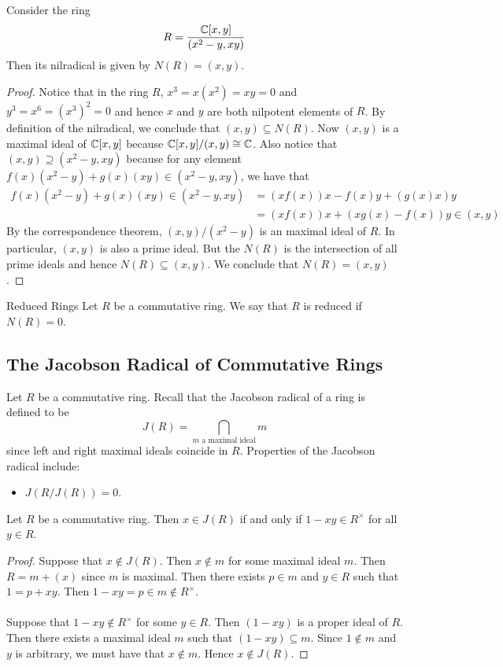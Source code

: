 \documentclass[a4paper]{article}
\begin{document}
\begin{eg}{}{} Consider the ring $$R=\frac{\mathbb{C}[x,y]}{(x^2-y,xy)}$$ Then its nilradical is given by $N(R)=(x,y)$. \tcbline
\begin{proof}
Notice that in the ring $R$, $x^3=x(x^2)=xy=0$ and $y^3=x^6=(x^3)^2=0$ and hence $x$ and $y$ are both nilpotent elements of $R$. By definition of the nilradical, we conclude that $(x,y)\subseteq N(R)$. Now $(x,y)$ is a maximal ideal of $\mathbb{C}[x,y]$ because $\mathbb{C}[x,y]/(x,y)\cong\mathbb{C}$. Also notice that $(x,y)\supseteq(x^2-y,xy)$ because for any element $f(x)(x^2-y)+g(x)(xy)\in(x^2-y,xy)$, we have that 
\begin{align*}
f(x)(x^2-y)+g(x)(xy)\in(x^2-y,xy)&=(xf(x))x-f(x)y+(g(x)x)y\\
&=(xf(x))x+(xg(x)-f(x))y\in (x,y)
\end{align*}
By the correspondence theorem, $(x,y)/(x^2-y)$ is an maximal ideal of $R$. In particular, $(x,y)$ is also a prime ideal. But the $N(R)$ is the intersection of all prime ideals and hence $N(R)\subseteq(x,y)$. We conclude that $N(R)=(x,y)$. 
\end{proof}
\end{eg}

\begin{defn}{Reduced Rings}{} Let $R$ be a commutative ring. We say that $R$ is reduced if $N(R)=0$. 
\end{defn}

\subsection{The Jacobson Radical of Commutative Rings}
Let $R$ be a commutative ring. Recall that the Jacobson radical of a ring is defined to be $$J(R)=\bigcap_{m\text{ a maximal ideal}}m$$ since left and right maximal ideals coincide in $R$. Properties of the Jacobson radical include: 
\begin{itemize}
\item $J(R/J(R))=0$. 
\end{itemize}

\begin{lmm}{}{} Let $R$ be a commutative ring. Then $x\in J(R)$ if and only if $1-xy\in R^\times$ for all $y\in R$. \tcbline
\begin{proof}
Suppose that $x\notin J(R)$. Then $x\notin m$ for some maximal ideal $m$. Then $R=m+(x)$ since $m$ is maximal. Then there exists $p\in m$ and $y\in R$ such that $1=p+xy$. Then $1-xy=p\in m\notin R^\times$. \\~\\

Suppose that $1-xy\notin R^\times$ for some $y\in R$. Then $(1-xy)$ is a proper ideal of $R$. Then there exists a maximal ideal $m$ such that $(1-xy)\subseteq m$. Since $1\notin m$ and $y$ is arbitrary, we must have that $x\notin m$. Hence $x\notin J(R)$. 
\end{proof}
\end{lmm}
\end{document}
